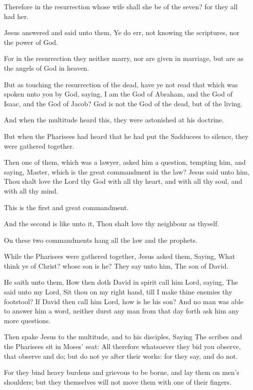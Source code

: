 \Verse Therefore in the resurrection whose wife shall she be of the seven?  for they all had her.

\Verse Jesus answered and said unto them, Ye do err, not knowing the scriptures, nor the power of God.

\Verse For in the resurrection they neither marry, nor are given in marriage, but are as the angels of God in heaven.

\Verse But as touching the resurrection of the dead, have ye not read that which was spoken unto you by God, saying, \Verse I am the God of Abraham, and the God of Isaac, and the God of Jacob?  God is not the God of the dead, but of the living.

\Verse And when the multitude heard this, they were astonished at his doctrine.

\Verse But when the Pharisees had heard that he had put the Sadducees to silence, they were gathered together.

\Verse Then one of them, which was a lawyer, asked him a question, tempting him, and saying, \Verse Master, which is the great commandment in the law?  \Verse Jesus said unto him, Thou shalt love the Lord thy God with all thy heart, and with all thy soul, and with all thy mind.

\Verse This is the first and great commandment.

\Verse And the second is like unto it, Thou shalt love thy neighbour as thyself.

\Verse On these two commandments hang all the law and the prophets.

\Verse While the Pharisees were gathered together, Jesus asked them, \Verse Saying, What think ye of Christ? whose son is he? They say unto him, The son of David.

\Verse He saith unto them, How then doth David in spirit call him Lord, saying, \Verse The \LORD said unto my Lord, Sit thou on my right hand, till I make thine enemies thy footstool?  \Verse If David then call him Lord, how is he his son?  \Verse And no man was able to answer him a word, neither durst any man from that day forth ask him any more questions.


\Chapter
\Verse Then spake Jesus to the multitude, and to his disciples, \Verse Saying The scribes and the Pharisees sit in Moses' seat: \Verse All therefore whatsoever they bid you observe, that observe and do; but do not ye after their works: for they say, and do not.

\Verse For they bind heavy burdens and grievous to be borne, and lay them on men's shoulders; but they themselves will not move them with one of their fingers.

